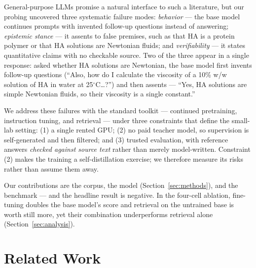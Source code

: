 \documentclass[11pt]{article}
\begin{document}
General-purpose LLMs promise a natural interface to such a literature,
but our probing uncovered three systematic failure modes:
\emph{behavior} --- the base model continues prompts with invented
follow-up questions instead of answering; \emph{epistemic stance} ---
it assents to false premises, such as that HA is a protein polymer or
that HA solutions are Newtonian fluids; and \emph{verifiability} --- it
states quantitative claims with no checkable source. Two of the three
appear in a single response: asked whether HA solutions are Newtonian,
the base model first invents follow-up questions (``Also, how do I
calculate the viscosity of a 10\% w/w solution of HA in water at
25$^\circ$C\ldots?'') and then assents --- ``Yes, HA solutions are
simple Newtonian fluids, so their viscosity is a single constant.''

We address these failures with the standard toolkit --- continued
pretraining, instruction tuning, and retrieval --- under three
constraints that define the small-lab setting: (1) a single rented GPU;
(2) no paid teacher model, so supervision is self-generated and then
filtered; and (3) trusted evaluation, with reference answers
\emph{checked against source text} rather than merely model-written.
Constraint (2) makes the training a self-distillation exercise; we
therefore measure its risks rather than assume them away.

Our contributions are the corpus, the model
(Section~\ref{sec:methods}), and the benchmark --- and the headline
result is negative. In the four-cell ablation, fine-tuning doubles the base
model's score and retrieval on the untrained base is worth still more,
yet their combination underperforms retrieval alone
(Section~\ref{sec:analysis}).

\section{Related Work}
\label{sec:related}
\end{document}
